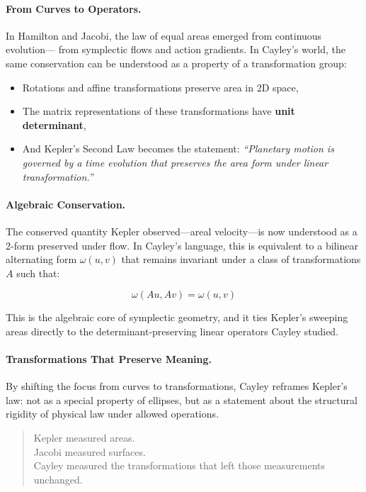 \bigskip

\paragraph{From Curves to Operators.}

In Hamilton and Jacobi, the law of equal areas emerged from continuous evolution—  
from symplectic flows and action gradients.  
In Cayley’s world, the same conservation can be understood as a property of a transformation group:

\begin{itemize}
  \item Rotations and affine transformations preserve area in 2D space,
  \item The matrix representations of these transformations have \textbf{unit determinant},
  \item And Kepler’s Second Law becomes the statement: \textit{``Planetary motion is governed by a time evolution that preserves the area form under linear transformation.''}
\end{itemize}

\bigskip

\paragraph{Algebraic Conservation.}

The conserved quantity Kepler observed—areal velocity—is now understood as a 2-form preserved under flow.  
In Cayley’s language, this is equivalent to a bilinear alternating form \( \omega(u,v) \)  
that remains invariant under a class of transformations \( A \) such that:

\[
\omega(Au, Av) = \omega(u, v)
\]

This is the algebraic core of symplectic geometry,  
and it ties Kepler’s sweeping areas directly to the determinant-preserving linear operators Cayley studied.

\bigskip

\paragraph{Transformations That Preserve Meaning.}

By shifting the focus from curves to transformations, Cayley reframes Kepler’s law:  
not as a special property of ellipses,  
but as a statement about the structural rigidity of physical law under allowed operations.

\bigskip

\begin{quote}
Kepler measured areas.\\
Jacobi measured surfaces.\\
Cayley measured the transformations that left those measurements unchanged.
\end{quote}
